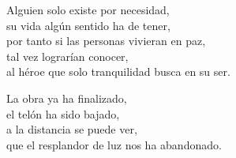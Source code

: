 \begin{center}
\vspace{1em} 
Alguien solo existe por necesidad,\\ 
su vida algún sentido ha de tener,\\ 
por tanto si las personas vivieran en paz,\\ 
tal vez lograrían conocer,\\ 
al héroe que solo tranquilidad busca en su ser.

\vspace{1em} 
La obra ya ha finalizado,\\ 
el telón ha sido bajado,\\ 
a la distancia se puede ver,\\ 
que el resplandor de luz nos ha abandonado.


\end{center}




